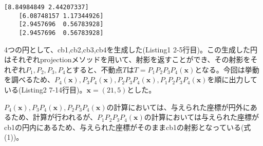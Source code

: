 \documentclass{jsarticle}
\begin{document}
\begin{lstlisting}[caption = 出力結果]
    [8.84984849 2.44207337]
    [6.08748157 1.17344926]
    [2.9457696  0.56783928]
    [2.9457696  0.56783928]
\end{lstlisting}
\par 4つの円として、cb1,cb2,cb3,cb4を生成した(Listing1 2-5行目)。この生成した円はそれぞれprojectionメソッドを用いて、射影を返すことができ、その射影をそれぞれ$P_1, P_2, P_3, P_4$とすると、不動点$T$は$T = P_1P_2P_3P_4(\bm{x})$となる。今回は挙動を調べるため、$P_4(\bm{x}), P_3P_4(\bm{x}) , P_2P_3P_4(\bm{x}), P_1P_2P_3P_4(\bm{x})$を順に出力している(Listing2 7-14行目)。$\bm{x} = (21, 5)$とした。
\par $P_4(\bm{x}), P_3P_4(\bm{x}) , P_2P_3P_4(\bm{x})$の計算においては、与えられた座標が円外にあるため、計算が行われるが、$P_1P_2P_3P_4(\bm{x})$の計算においては与えられた座標がcb1の円内にあるため、与えられた座標がそのままcb1の射影となっている(式(1))。
\newpage
\end{document}

